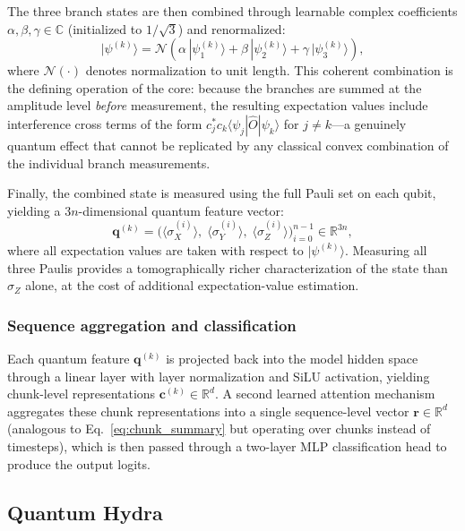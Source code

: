 \documentclass[conference]{IEEEtran}
\begin{document}
The three branch states are then combined through learnable complex coefficients $\alpha, \beta, \gamma \in \mathbb{C}$ (initialized to $1/\sqrt{3}$) and renormalized:
\begin{equation}
    |\psi^{(k)}\rangle = \mathcal{N}\!\left(\alpha\,|\psi_1^{(k)}\rangle + \beta\,|\psi_2^{(k)}\rangle + \gamma\,|\psi_3^{(k)}\rangle\right),
    \label{eq:superposition}
\end{equation} %
where $\mathcal{N}(\cdot)$ denotes normalization to unit length.
This coherent combination is the defining operation of the core: because the branches are summed at the amplitude level \emph{before} measurement, the resulting expectation values include interference cross terms of the form $c_j^{*} c_k \langle\psi_j|\hat{O}|\psi_k\rangle$ for $j \neq k$---a genuinely quantum effect that cannot be replicated by any classical convex combination of the individual branch measurements.

Finally, the combined state is measured using the full Pauli set on each qubit, yielding a $3n$-dimensional quantum feature vector:
\begin{equation}
    \mathbf{q}^{(k)} = \Big(\langle\sigma_X^{(i)}\rangle,\; \langle\sigma_Y^{(i)}\rangle,\; \langle\sigma_Z^{(i)}\rangle\Big)_{i=0}^{n-1} \in \mathbb{R}^{3n},
    \label{eq:measurement}
\end{equation}
where all expectation values are taken with respect to $|\psi^{(k)}\rangle$.
Measuring all three Paulis provides a tomographically richer characterization of the state than $\sigma_Z$ alone, at the cost of additional expectation-value estimation.

\subsubsection{Sequence aggregation and classification}
Each quantum feature $\mathbf{q}^{(k)}$ is projected back into the model hidden space through a linear layer with layer normalization and SiLU activation, yielding chunk-level representations $\mathbf{c}^{(k)} \in \mathbb{R}^{d}$.
A second learned attention mechanism aggregates these chunk representations into a single sequence-level vector $\mathbf{r} \in \mathbb{R}^{d}$ (analogous to Eq.~\eqref{eq:chunk_summary} but operating over chunks instead of timesteps), which is then passed through a two-layer MLP classification head to produce the output logits.

\subsection{Quantum Hydra}
\label{sec:quantum_hydra}
\end{document}
